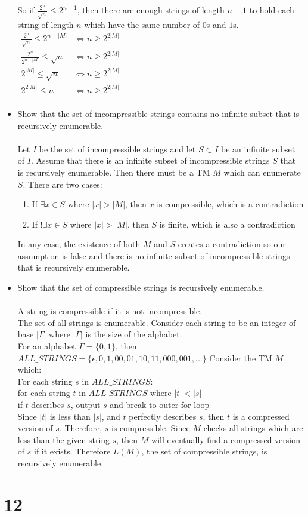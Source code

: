 \documentclass[letterpaper,notitlepage,twoside]{article}
\renewcommand{\iff}{\Leftrightarrow} %
\newcommand\tab[1][1cm]{\hspace*{#1}} %
\begin{document}
\begin{itemize}
So if $\frac{2^n}{\sqrt{n}} \leq 2^{n - 1}$, then there are enough strings of length $n - 1$ to hold each string of length $n$ which have the same number of $0$s and $1$s.\\

$\begin{aligned}
\frac{2^n}{\sqrt{n}} \leq 2^{n - |M|} &\iff n \geq 2^{2|M|} \\
\frac{2^n}{2^{n - |M|}} \leq \sqrt{n} &\iff n \geq 2^{2|M|} \\
2^{|M|} \leq \sqrt{n} &\iff n \geq 2^{2|M|} \\
2^{2|M|} \leq n &\iff n \geq 2^{2|M|} \\
\end{aligned}$

\item Show that the set of incompressible strings contains no infinite subset that is recursively enumerable.\\\\
Let $I$ be the set of incompressible strings and let $S \subset I$ be an infinite subset of $I$. Assume that there is an infinite subset of incompressible strings $S$ that is recursively enumerable. Then there must be a TM $M$ which can enumerate $S$. There are two cases:
\begin{enumerate}
\item If $\exists x \in S$ where $|x| > |M|$, then $x$ is compressible, which is a contradiction
\item If $!\exists x \in S$ where $|x| > |M|$, then $S$ is finite, which is also a contradiction
\end{enumerate}
In any case, the existence of both $M$ and $S$ creates a contradiction so our assumption is false and there is no infinite subset of incompressible strings that is recursively enumerable.

\item Show that the set of compressible strings is recursively enumerable.\\\\
A string is compressible if it is not incompressible.\\
The set of all strings is enumerable. Consider each string to be an integer of base $|\Gamma|$ where $|\Gamma|$ is the size of the alphabet. \\
For an alphabet $\Gamma = \{0, 1\}$, then $ALL\_STRINGS = \{\epsilon, 0, 1, 00, 01, 10, 11, 000, 001,...\}$
Consider the TM $M$ which: \\
For each string $s$ in $ALL\_STRINGS$: \\
	\tab for each string $t$ in $ALL\_STRINGS$ where $|t| < |s|$ \\
		\tab\tab if $t$ describes $s$, output $s$ and break to outer for loop \\		
Since $|t|$ is less than $|s|$, and $t$ perfectly describes $s$, then $t$ is a compressed version of $s$. Therefore, $s$ is compressible. Since $M$ checks all strings which are less than the given string $s$, then $M$ will eventually find a compressed version of $s$ if it exists. Therefore $L(M)$, the set of compressible strings, is recursively enumerable.


\end{itemize}
\section*{12}
\end{document}
